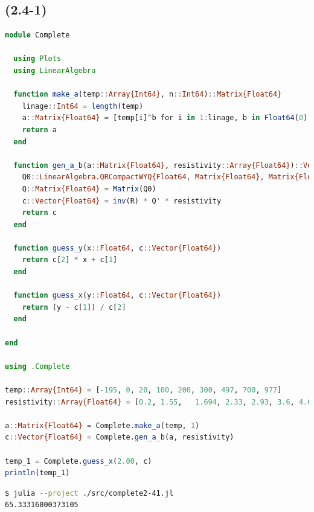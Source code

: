 \documentclass[uplatex, dvipdfmx, a4j,11pt]{jsarticle}
\begin{document}
\subsection*{(2.4-1)}
\begin{lstlisting}[title={(2-3)}, label=code:in, language=Julia]
  module Complete

  using Plots
  using LinearAlgebra

  function make_a(temp::Array{Int64}, n::Int64)::Matrix{Float64}
    linage::Int64 = length(temp)
    a::Matrix{Float64} = [temp[i]^b for i in 1:linage, b in Float64(0):Float64(n)]
    return a
  end

  function gen_a_b(a::Matrix{Float64}, resistivity::Array{Float64})::Vector{Float64}
    Q0::LinearAlgebra.QRCompactWYQ{Float64, Matrix{Float64}, Matrix{Float64}}, R::Matrix{Float64} = LinearAlgebra.qr(a)
    Q::Matrix{Float64} = Matrix(Q0)
    c::Vector{Float64} = inv(R) * Q' * resistivity
    return c
  end

  function guess_y(x::Float64, c::Vector{Float64})
    return c[2] * x + c[1] 
  end

  function guess_x(y::Float64, c::Vector{Float64})
    return (y - c[1]) / c[2]
  end

end

using .Complete

temp::Array{Int64} = [-195, 0, 20, 100, 200, 300, 497, 700, 977]
resistivity::Array{Float64} = [0.2,	1.55,	1.694, 2.33, 2.93, 3.6, 4.6, 6.7, 8.1]

a::Matrix{Float64} = Complete.make_a(temp, 1)
c::Vector{Float64} = Complete.gen_a_b(a, resistivity)

temp_1 = Complete.guess_x(2.00, c)
println(temp_1)

\end{lstlisting}
\begin{lstlisting}[title={(2.4-1の実行結果)}, label=code:in, language=sh]
$ julia --project ./src/complete2-41.jl
65.33316000373105
\end{lstlisting}
\end{document}
